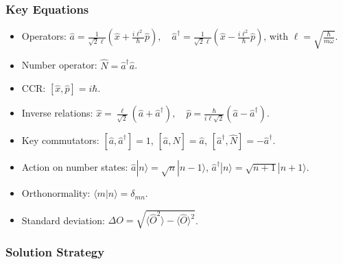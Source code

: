 \documentclass[10pt]{article}
\begin{document}
\subsubsection*{Key Equations}
\begin{itemize}
    \item Operators: \(\hat{a}=\frac{1}{\sqrt{2} \ell}\left(\hat{x}+\frac{i \ell^{2}}{\hbar} \hat{p}\right), \quad \hat{a}^{\dagger}=\frac{1}{\sqrt{2} \ell}\left(\hat{x}-\frac{i \ell^{2}}{\hbar} \hat{p}\right)\), with \(\ell=\sqrt{\frac{\hbar}{m \omega}}\).
    \item Number operator: \(\hat{N}=\hat{a}^{\dagger} \hat{a}\).
    \item CCR: \([\hat{x}, \hat{p}]=i\hbar\).
    \item Inverse relations: \(\hat{x} = \frac{\ell}{\sqrt{2}}(\hat{a}+\hat{a}^\dagger), \quad \hat{p} = \frac{\hbar}{i\ell\sqrt{2}}(\hat{a}-\hat{a}^\dagger)\).
    \item Key commutators: \([\hat{a}, \hat{a}^\dagger]=1\), \([\hat{a}, \hat{N}]=\hat{a}\), \([\hat{a}^\dagger, \hat{N}]=-\hat{a}^\dagger\).
    \item Action on number states: \(\hat{a}|n\rangle=\sqrt{n}|n-1\rangle\), \(\hat{a}^{\dagger}|n\rangle=\sqrt{n+1}|n+1\rangle\).
    \item Orthonormality: \(\langle m | n \rangle = \delta_{mn}\).
    \item Standard deviation: \(\Delta O = \sqrt{\langle \hat{O}^2 \rangle - \langle \hat{O} \rangle^2}\).
\end{itemize}

\subsubsection*{Solution Strategy}
\end{document}
